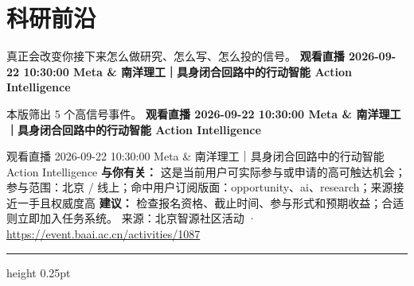 \documentclass[10.5pt]{ctexart}
\begin{document}
\section*{科研前沿}
{\color{ormuted} 真正会改变你接下来怎么做研究、怎么写、怎么投的信号。}
\vspace{2mm}
{\LARGE\bfseries 观看直播 2026-09-22 10:30:00 Meta \& 南洋理工｜具身闭合回路中的行动智能 Action Intelligence}\par
\vspace{1mm}
{\color{ormuted} 本版筛出 5 个高信号事件。}
\vspace{3mm}
{\Large\bfseries 观看直播 2026-09-22 10:30:00 Meta \& 南洋理工｜具身闭合回路中的行动智能 Action Intelligence}\par
观看直播 2026-09-22 10:30:00 Meta \& 南洋理工｜具身闭合回路中的行动智能 Action Intelligence
\textbf{与你有关：} 这是当前用户可实际参与或申请的高可触达机会；参与范围：北京 / 线上；命中用户订阅版面：opportunity、ai、research；来源接近一手且权威度高
\textbf{建议：} 检查报名资格、截止时间、参与形式和预期收益；合适则立即加入任务系统。
{\footnotesize\color{ormuted} 来源：北京智源社区活动 · \url{https://event.baai.ac.cn/activities/1087}}
\vspace{4mm}
\hrule height 0.25pt
\vspace{3mm}
\end{document}
